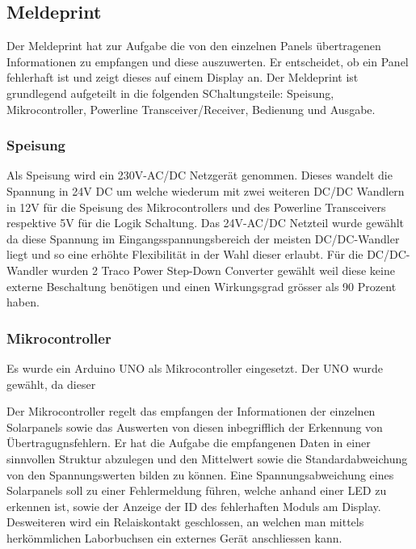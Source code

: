 \subsection{Meldeprint}
Der Meldeprint hat zur Aufgabe die von den einzelnen Panels übertragenen Informationen zu empfangen und diese auszuwerten. Er entscheidet, ob ein Panel fehlerhaft ist und zeigt dieses auf einem Display an. Der Meldeprint ist grundlegend aufgeteilt in die folgenden SChaltungsteile: Speisung, Mikrocontroller, Powerline Transceiver/Receiver, Bedienung und Ausgabe.

\subsubsection{Speisung}
Als Speisung wird ein 230V-AC/DC Netzgerät genommen. Dieses wandelt die Spannung in 24V DC um welche wiederum mit zwei weiteren DC/DC Wandlern in 12V für die Speisung des Mikrocontrollers und des Powerline Transceivers respektive 5V für die Logik Schaltung. Das 24V-AC/DC Netzteil wurde gewählt da diese Spannung im Eingangsspannungsbereich der meisten DC/DC-Wandler liegt und so eine erhöhte Flexibilität in der Wahl dieser erlaubt. Für die DC/DC-Wandler wurden 2 Traco Power Step-Down Converter gewählt weil diese keine externe Beschaltung benötigen und einen Wirkungsgrad grösser als 90 Prozent haben.

\subsubsection{Mikrocontroller}
Es wurde ein Arduino UNO als Mikrocontroller eingesetzt. Der UNO wurde gewählt, da dieser 

Der Mikrocontroller regelt das empfangen der Informationen der einzelnen Solarpanels sowie das Auswerten von diesen inbegrifflich der Erkennung von Übertragugnsfehlern. Er hat die Aufgabe die empfangenen Daten in einer sinnvollen Struktur abzulegen und den Mittelwert sowie die Standardabweichung von den Spannungswerten bilden zu können. Eine Spannungsabweichung eines Solarpanels soll zu einer Fehlermeldung führen, welche anhand einer LED zu erkennen ist, sowie der Anzeige der ID des fehlerhaften Moduls am Display. Desweiteren wird ein Relaiskontakt geschlossen, an welchen man mittels herkömmlichen Laborbuchsen ein externes Gerät anschliessen kann.


